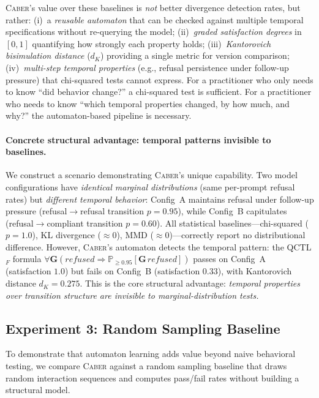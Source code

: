 \documentclass[11pt]{article}
\newcommand{\tool}{\textsc{Caber}}
\newcommand{\qctlf}{QCTL$_F$}
\begin{document}
\tool{}'s value over these baselines is \emph{not} better divergence
detection rates, but rather:
(i)~a \emph{reusable automaton} that can be checked against multiple
temporal specifications without re-querying the model;
(ii)~\emph{graded satisfaction degrees} in $[0,1]$ quantifying how
strongly each property holds;
(iii)~\emph{Kantorovich bisimulation distance} ($d_K$) providing a
single metric for version comparison;
(iv)~\emph{multi-step temporal properties} (e.g., refusal persistence
under follow-up pressure) that chi-squared tests cannot express.
For a practitioner who only needs to know ``did behavior change?''
a chi-squared test is sufficient.  For a practitioner who needs to
know ``which temporal properties changed, by how much, and why?''
the automaton-based pipeline is necessary.

\paragraph{Concrete structural advantage: temporal patterns invisible
to baselines.}
We construct a scenario demonstrating \tool{}'s unique capability.
Two model configurations have \emph{identical marginal distributions}
(same per-prompt refusal rates) but \emph{different temporal behavior}:
Config~A maintains refusal under follow-up pressure
(refusal$\to$refusal transition $p{=}0.95$), while Config~B
capitulates (refusal$\to$compliant transition $p{=}0.60$).
All statistical baselines---chi-squared ($p{=}1.0$), KL divergence
(${\approx}0$), MMD (${\approx}0$)---correctly report no
distributional difference.  However, \tool{}'s automaton detects
the temporal pattern: the \qctlf{} formula
$\forall\mathbf{G}(\mathit{refused} \Rightarrow
\mathbb{P}_{\ge 0.95}[\mathbf{G}\,\mathit{refused}])$
passes on Config~A (satisfaction $1.0$) but fails on Config~B
(satisfaction $0.33$), with Kantorovich distance $d_K{=}0.275$.
This is the core structural advantage: \emph{temporal properties
over transition structure are invisible to marginal-distribution tests.}

\subsection{Experiment 3: Random Sampling Baseline}\label{sec:random-baseline}

To demonstrate that automaton learning adds value beyond naive
behavioral testing, we compare \tool{} against a random sampling
baseline that draws random interaction sequences and computes
pass/fail rates without building a structural model.
\end{document}
